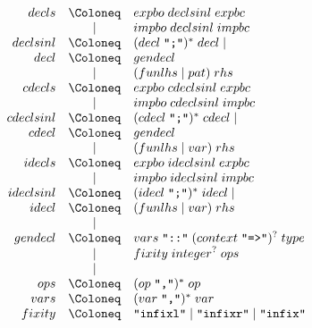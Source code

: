 \begin{align*}
  \begin{array}{rcl}
    {decls}
    & \Coloneq & {expbo}\; {declsinl}\; {expbc} \\
    & \mid & {impbo}\; {declsinl}\; {impbc} \\
    {declsinl}
    & \Coloneq & ({decl}\; \text{\texttt{\textquotedbl;\textquotedbl}})^*\; {decl} \mid \\
    {decl}
    & \Coloneq & {gendecl} \\
    & \mid & ({funlhs} \mid {pat})\; {rhs} \\
    {cdecls}
    & \Coloneq & {expbo}\; {cdeclsinl}\; {expbc} \\
    & \mid & {impbo}\; {cdeclsinl}\; {impbc} \\
    {cdeclsinl}
    & \Coloneq & ({cdecl}\; \text{\texttt{\textquotedbl;\textquotedbl}})^*\; {cdecl} \mid \\
    {cdecl}
    & \Coloneq & {gendecl} \\
    & \mid & ({funlhs} \mid {var})\; {rhs} \\
    {idecls}
    & \Coloneq & {expbo}\; {ideclsinl}\; {expbc} \\
    & \mid & {impbo}\; {ideclsinl}\; {impbc} \\
    {ideclsinl}
    & \Coloneq & ({idecl}\; \text{\texttt{\textquotedbl;\textquotedbl}})^*\; {idecl} \mid \\
    {idecl}
    & \Coloneq & ({funlhs} \mid {var})\; {rhs} \\
    & \mid & \\
    {gendecl}
    & \Coloneq & {vars}\; \text{\texttt{\textquotedbl ::\textquotedbl}}\; ({context}\; \text{\texttt{\textquotedbl =>\textquotedbl}})^?\; {type} \\
    & \mid & {fixity}\; {integer}^?\; {ops} \\
    & \mid & \\
    {ops}
    & \Coloneq & ({op}\; \text{\texttt{\textquotedbl,\textquotedbl}})^*\; {op} \\
    {vars}
    & \Coloneq & ({var}\; \text{\texttt{\textquotedbl,\textquotedbl}})^*\; {var} \\
    {fixity}
    & \Coloneq & \text{\texttt{\textquotedbl infixl\textquotedbl}}
    \mid \text{\texttt{\textquotedbl infixr\textquotedbl}}
    \mid \text{\texttt{\textquotedbl infix\textquotedbl}}
  \end{array}
\end{align*}

